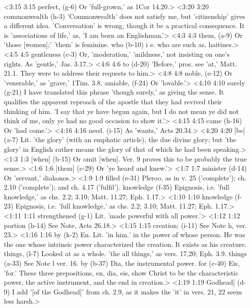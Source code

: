 <3:15 3:15  perfect, (g-6)  Or 'full-grown,' as 1Cor 14.20.>
<3:20 3:20  commonwealth (h-3)  'Commonwealth' does not satisfy me, but 'citizenship' gives a  different idea. 'Conversation' is wrong, though it be a  practical consequence. It is 'associations of life,' as, 'I  am born an Englishman.'>
<4:3 4:3  them, (a-9)  Or 'those [women];' 'them' is feminine.
  who (b-10)  i e. who are such as, haitines.>
<4:5 4:5  gentleness (c-3)  Or, 'moderation,' 'mildness,' not insisting on one's rights.  As 'gentle,' Jas. 3.17.>
<4:6 4:6  to (d-20)  'Before,' pros. see 'at,' Matt. 21.1. They were to address  their requests to him.>
<4:8 4:8  noble, (e-12)  Or 'venerable,' as 'grave,' 1Tim. 3.8.
  amiable, (f-24)  Or 'lovable.'>
<4:10 4:10  surely (g-21)  I have translated this phrase 'though surely,' as giving the  sense. It qualifies the apparent reproach of the apostle that  they had revived their thinking of him. 'I say that ye have  begun again, but I do not mean ye did not think of me, only ye  had no good occasion to show it.'>
<4:15 4:15  came (h-16)  Or 'had come.'>
<4:16 4:16  need. (i-15)  As 'wants,' Acts 20.34.>
<4:20 4:20  [be] (a-7)  Lit. 'the glory' (with an emphatic article), the due divine  glory; but 'the glory' in English rather means the glory of  that of which he had been speaking.>
<1:3 1:3  [when] (b-15)  Or omit [when]. Ver. 9 proves this to be probably the true  sense.>
<1:6 1:6  [them] (c-29)  Or 'ye heard and knew.'>
<1:7 1:7  minister (d-14)  Or 'servant,' diakonos.>
<1:9 1:9  filled (e-31)  Pleroo, as in v. 25 ('complete'); ch. 2.10 ('complete');  and ch. 4.17 ('fulfil').
  knowledge (f-35)  Epignosis, i.e. 'full knowledge,' as chs. 2.2; 3.10; Matt.  11.27; Eph. 1.17.>
<1:10 1:10  knowledge (f-23)  Epignosis, i.e. 'full knowledge,' as chs. 2.2; 3.10; Matt.  11.27; Eph. 1.17.>
<1:11 1:11  strengthened (g-1)  Lit. 'made powerful with all power.'>
<1:12 1:12  portion (h-14)  See Note, Acts 26.18.>
<1:15 1:15  creation; (i-11)  See Note h, ver. 23.>
<1:16 1:16  by (k-2)  En. Lit. 'in him,' in the power of whose person. He was the  one whose intrinsic power characterized the creation. It exists  as his creature.
  things, (l-7)  Looked at as a whole. 'the all things,' as vers. 17,20;  Eph. 3.9.
  things (a-33)  See Note l ver. 16.
  by (b-37)  Dia, the instrumental power.
  for (c-40)  Eis, 'for.' These three prepositions, en, dia, eis,  show Christ to be the characteristic power, the active  instrument, and the end in creation.>
<1:19 1:19  Godhead] (d-9)  I add '[of the Godhead]' from ch. 2.9, as it makes the 'it'  in vers. 21, 22 seem less harsh.>
